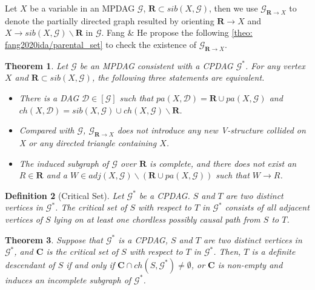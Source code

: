 \documentclass{article}
\newtheorem{theorem}{Theorem}[section]
\newtheorem{definition}[theorem]{Definition}
\begin{document}
Let $X$ be a variable in an MPDAG $\mathcal{G}$, $\mathbf{R} \subset{sib(X, \mathcal{G})}$, then we use $\mathcal{G}_{\mathbf{R} \rightarrow X}$ to denote the partially directed graph resulted by orienting $\mathbf{R} \rightarrow X$ and $X \rightarrow sib(X,\mathcal{G}) \backslash \mathbf{R}$ in $\mathcal{G}$.  Fang \& He \citep{fang2020ida} propose the following \cref{theo: fang2020ida/parental_set} to check the existence of $\mathcal{G}_{\mathbf{R} \rightarrow X}$.
\begin{theorem}\citep[Theorem 1]{fang2020ida}
\label{theo: fang2020ida/Theorem_1}
\label{theo: fang2020ida/parental_set}
    Let $\mathcal{G}$ be an MPDAG consistent with a CPDAG $\mathcal{G^*}$. For any vertex $X$ and $\mathbf{R}\subset{sib(X, \mathcal{G})}$, the following three statements are equivalent.
    \begin{itemize}[leftmargin=*]
    \itemsep0em
        \item There is a DAG $\mathcal{D} \in [\mathcal{G}]$ such that $pa(X,\mathcal{D})=\mathbf{R} \cup pa(X, \mathcal{G})$ and $ch(X,\mathcal{D}) = sib(X,\mathcal{G}) \cup ch(X,\mathcal{G}) \backslash \mathbf{R}$.
        \item Compared with $\mathcal{G}$, $\mathcal{G}_{\mathbf{R} \rightarrow X}$ does not introduce any new V-structure collided on X or any directed triangle containing $X$.
        \item The induced subgraph of $\mathcal{G}$ over $\mathbf{R}$ is complete, and there does not exist an $R \in \mathbf{R}$ and a $W \in adj(X, \mathcal{G}) \backslash (\mathbf{R} \cup pa(X, \mathcal{G}))$ such that $W \rightarrow R$.
    \end{itemize}
\end{theorem}


\begin{definition} [Critical Set] \citep[Definition 2]{fang2020ida} 
\label{def: fang2020ida/Critical Set}
    Let $\mathcal G^*$ be a CPDAG. $S$ and $T$ are two distinct vertices in $\mathcal G^*$. The critical set of $S$ with respect to $T$ in $\mathcal G^*$ consists of all adjacent vertices of $S$ lying on at least one chordless possibly causal path from $S$ to $T$.
\end{definition}

\begin{theorem} \citep[Theorem 1]{fang2022local}
\label{theo: fang2021local/CPDAG}
    Suppose that $\mathcal{G^*}$ is a CPDAG, $S$ and $T$ are two distinct vertices in $\mathcal{G^*}$, and $\mathbf{C}$ is the critical set of $S$ with respect to $T$ in $\mathcal{G^*}$. Then, $T$ is a definite descendant of $S$ if and only if $\mathbf{C} \cap{ch(S, \mathcal G^*)} \ne \emptyset$, or $\mathbf{C}$ is non-empty and induces an incomplete subgraph of $\mathcal{G^*}$.
\end{theorem}
\end{document}
